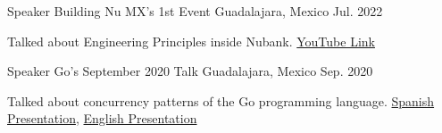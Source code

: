 

\begin{cventries}

  \cventry
    {Speaker} %
    {Building Nu MX's 1st Event} %
    {Guadalajara, Mexico} %
    {Jul. 2022} %
    {
      \begin{cvitems} %
        \item {Talked about Engineering Principles inside Nubank. \href{https://www.youtube.com/watch?v=o75pGPjBqmU}{YouTube Link}}
      \end{cvitems}
    }

  \cventry
    {Speaker} %
    {Go's September 2020 Talk} %
    {Guadalajara, Mexico} %
    {Sep. 2020} %
    {
      \begin{cvitems} %
        \item {Talked about concurrency patterns of the Go programming language. \href{https://www.youtube.com/watch?v=YpFuzEAWjJM}{Spanish Presentation}, \href{https://www.youtube.com/watch?v=uYQZ1e05rIc}{English Presentation}}
      \end{cvitems}
    }

\end{cventries}
